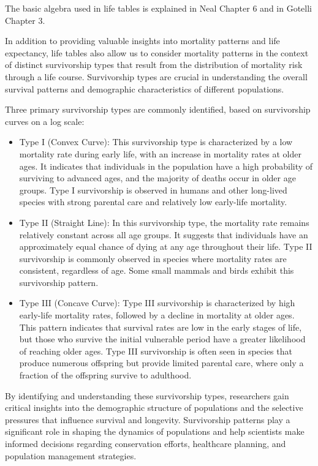 \documentclass[
  a4paper]{book}
\providecommand{\tightlist}{%
  \setlength{\itemsep}{0pt}\setlength{\parskip}{0pt}}
\begin{document}
The basic algebra used in life tables is explained in Neal Chapter 6 and in Gotelli Chapter 3.

In addition to providing valuable insights into mortality patterns and life expectancy, life tables also allow us to consider mortality patterns in the context of distinct survivorship types that result from the distribution of mortality risk through a life course. Survivorship types are crucial in understanding the overall survival patterns and demographic characteristics of different populations.

Three primary survivorship types are commonly identified, based on survivorship curves on a log scale:

\begin{itemize}
\tightlist
\item
  Type I (Convex Curve): This survivorship type is characterized by a low mortality rate during early life, with an increase in mortality rates at older ages. It indicates that individuals in the population have a high probability of surviving to advanced ages, and the majority of deaths occur in older age groups. Type I survivorship is observed in humans and other long-lived species with strong parental care and relatively low early-life mortality.
\item
  Type II (Straight Line): In this survivorship type, the mortality rate remains relatively constant across all age groups. It suggests that individuals have an approximately equal chance of dying at any age throughout their life. Type II survivorship is commonly observed in species where mortality rates are consistent, regardless of age. Some small mammals and birds exhibit this survivorship pattern.
\item
  Type III (Concave Curve): Type III survivorship is characterized by high early-life mortality rates, followed by a decline in mortality at older ages. This pattern indicates that survival rates are low in the early stages of life, but those who survive the initial vulnerable period have a greater likelihood of reaching older ages. Type III survivorship is often seen in species that produce numerous offspring but provide limited parental care, where only a fraction of the offspring survive to adulthood.
\end{itemize}

By identifying and understanding these survivorship types, researchers gain critical insights into the demographic structure of populations and the selective pressures that influence survival and longevity. Survivorship patterns play a significant role in shaping the dynamics of populations and help scientists make informed decisions regarding conservation efforts, healthcare planning, and population management strategies.
\end{document}
